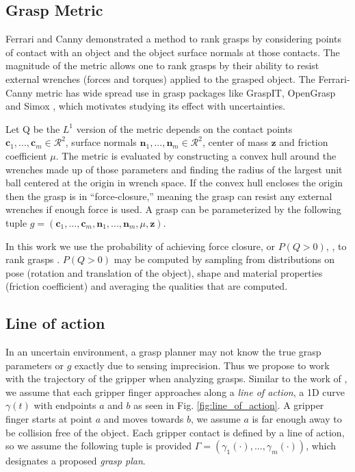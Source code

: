 \documentclass[journal,transmag]{IEEEtran}%
\begin{document}
\subsection{Grasp Metric}
Ferrari and Canny \cite{ferrari1992} demonstrated a method to rank grasps by considering points of contact with an object and the object surface normals at those contacts. The magnitude of the metric allows one to rank grasps by their ability to resist external wrenches (forces and torques) applied to the grasped object. The Ferrari-Canny metric has wide spread use in grasp packages like GraspIT\cite{miller2004graspit}, OpenGrasp\cite{73} and Simox \cite{vahrenkamp2010simo}, which motivates studying its effect with uncertainties. 

Let Q be the $L^1$ version of the metric depends on the contact points $\textbf{c}_1,...,\textbf{c}_m \in \mathcal{R}^2$, surface normals $\textbf{n}_1,...,\textbf{n}_m \in \mathcal{R}^2$, center of mass $\textbf{z}$ and friction coefficient $\mu$. The metric is evaluated by constructing a convex hull around the wrenches made up of those parameters and finding the radius of the largest unit ball centered at the origin in wrench space. If the convex hull  encloses the origin then the grasp is in ``force-closure,'' meaning the grasp can resist any external wrenches if enough force is used. A grasp can be parameterized by the following tuple $g = ( \textbf{c}_1,...,\textbf{c}_m,\textbf{n}_1,...,\textbf{n}_m,\mu, \textbf{z} )$\cite{pokorny2013classical}.

In this work we use the probability of achieving force closure, or $P(Q>0)$, \cite{christopoulos2007handling}\cite{kehoe2012toward}, to rank grasps . $P(Q>0)$ may be computed by sampling from distributions on pose (rotation and translation of the object), shape and material properties (friction coefficient) and averaging the qualities that are computed.

\subsection{Line of action}
In an uncertain environment, a grasp planner may not know the true grasp parameters or $g$ exactly due to sensing imprecision. Thus we propose to work with the trajectory of the gripper when analyzing grasps. Similar to the work of \cite{christopoulos2007handling}, we assume that each gripper finger approaches along a \textit{line of action}, a 1D curve $\gamma(t)$ with endpoints $a$ and $b$ as seen in Fig. \ref{fig:line_of_action}.
A gripper finger starts at point $a$ and moves towards $b$, we assume $a$ is far enough away to be collision free of the object.
Each gripper contact is defined by a line of action, so we assume the following tuple is provided $\Gamma = ( \gamma_1(\cdot),...,\gamma_m(\cdot) )$, which designates a proposed \textit{grasp plan}.
\end{document}
